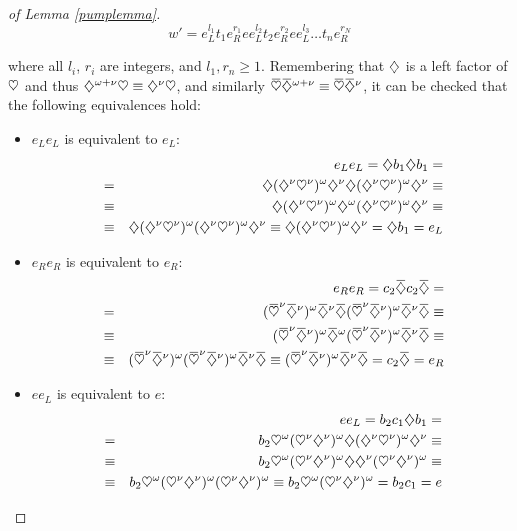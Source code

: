 \documentclass{article}
\begin{document}
\begin{proof}[of Lemma \ref{pumplemma}]
\[
w' = e_L^{l_1} t_1 e_R^{r_1} e e_L^{l_2} t_2 e_R^{r_2} e e_L^{l_3} \ldots
t_n e_R^{r_N} \]

where all $l_i$, $r_i$ are integers, and $l_1,r_n \geq 1$.
Remembering that $\diamondsuit$ is a left factor of $\heartsuit$ and thus $\diamondsuit^{\omega+\nu} \heartsuit \equiv 
\diamondsuit^\nu \heartsuit$, and similarly $\cb \ca^{\omega+\nu} \equiv \cb \ca^\nu$,
it can be checked that the following equivalences hold:

\begin{itemize}
\item $e_L e_L$ is equivalent to $e_L$:
\begin{eqnarray*}
&& e_L e_L = \diamondsuit b_1 \diamondsuit b_1 = \\ &=&
\diamondsuit (\diamondsuit^\nu \heartsuit^\nu)^\omega \diamondsuit^\nu \diamondsuit (\diamondsuit^\nu \heartsuit^\nu)^\omega \diamondsuit^\nu \equiv \\
&\equiv& \diamondsuit (\diamondsuit^\nu \heartsuit^\nu)^\omega \diamondsuit^\omega (\diamondsuit^\nu \heartsuit^\nu)^\omega \diamondsuit^\nu \equiv \\
&\equiv& \diamondsuit (\diamondsuit^\nu \heartsuit^\nu)^\omega (\diamondsuit^\nu \heartsuit^\nu)^\omega \diamondsuit^\nu \equiv
\diamondsuit (\diamondsuit^\nu \heartsuit^\nu)^\omega \diamondsuit^\nu = \diamondsuit b_1 = e_L
\end{eqnarray*}

\item $e_R e_R$ is equivalent to $e_R$:
\begin{eqnarray*}
&& e_R e_R = c_2 \ca c_2 \ca = \\ &=&
(\cb^\nu \ca^\nu)^\omega \ca^\nu \ca (\cb^\nu \ca^\nu)^\omega \ca^\nu \ca \equiv \\
&\equiv& (\cb^\nu \ca^\nu)^\omega \ca^\omega (\cb^\nu \ca^\nu)^\omega \ca^\nu \ca \equiv \\
&\equiv& (\cb^\nu \ca^\nu)^\omega (\cb^\nu \ca^\nu)^\omega \ca^\nu \ca \equiv
(\cb^\nu \ca^\nu)^\omega \ca^\nu \ca = c_2 \ca = e_R
\end{eqnarray*}

\item $e e_L$ is equivalent to $e$:
\begin{eqnarray*}
&& e e_L = b_2 c_1 \diamondsuit b_1 = \\ &=&
b_2 \heartsuit^\omega (\heartsuit^\nu \diamondsuit^\nu)^\omega \diamondsuit (\diamondsuit^\nu \heartsuit^\nu)^\omega \diamondsuit^\nu \equiv \\
&\equiv& b_2 \heartsuit^\omega (\heartsuit^\nu \diamondsuit^\nu)^\omega \diamondsuit \diamondsuit^\nu (\heartsuit^\nu \diamondsuit^\nu)^\omega \equiv \\
&\equiv& b_2 \heartsuit^\omega (\heartsuit^\nu \diamondsuit^\nu)^\omega (\heartsuit^\nu \diamondsuit^\nu)^\omega \equiv
b_2 \heartsuit^\omega (\heartsuit^\nu \diamondsuit^\nu)^\omega = b_2 c_1 = e
\end{eqnarray*}


\end{itemize}
\end{proof}
\end{document}
